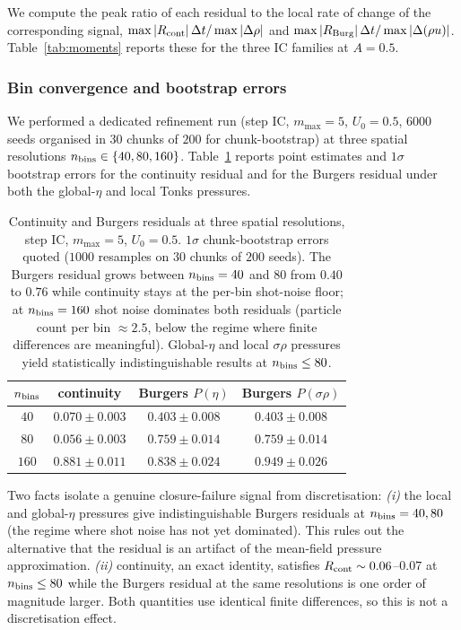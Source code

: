\documentclass[aps,pre,twocolumn,superscriptaddress,longbibliography,floatfix]{revtex4-2}
\begin{document}
We compute the peak ratio of each residual to the local rate of
change of the corresponding signal,
$\max|R_{\rm cont}|\,\Delta t / \max|\Delta\rho|$ and
$\max|R_{\rm Burg}|\,\Delta t / \max|\Delta(\rho u)|$.
Table~\ref{tab:moments} reports these for the three IC families
at $A=0.5$.

\subsubsection*{Bin convergence and bootstrap errors}

We performed a dedicated refinement run (step IC, $m_{\max}=5$,
$U_0=0.5$, $6000$ seeds organised in $30$ chunks of $200$ for
chunk-bootstrap) at three spatial resolutions
$n_{\rm bins}\in\{40,80,160\}$.
Table~\ref{tab:refine} reports point estimates and $1\sigma$
bootstrap errors for the continuity residual and for the Burgers
residual under both the global-$\eta$ and local Tonks pressures.

\begin{table}[t]
\centering
\caption{Continuity and Burgers residuals at three spatial
resolutions, step IC, $m_{\max}=5$, $U_0=0.5$.
$1\sigma$ chunk-bootstrap errors quoted ($1000$ resamples on
$30$ chunks of $200$ seeds). The Burgers residual grows
between $n_{\rm bins}=40$ and $80$ from $0.40$ to $0.76$ while
continuity stays at the per-bin shot-noise floor; at
$n_{\rm bins}=160$ shot noise dominates both residuals
(particle count per bin $\approx 2.5$, below the regime where
finite differences are meaningful). Global-$\eta$ and local
$\sigma\rho$ pressures yield statistically indistinguishable
results at $n_{\rm bins}\le 80$.}
\label{tab:refine}
\begin{tabular}{cccc}
\hline\hline
$n_{\rm bins}$ & continuity & Burgers $P(\eta)$
                                  & Burgers $P(\sigma\rho)$\\
\hline
$40$  & $0.070\pm 0.003$ & $0.403\pm 0.008$ & $0.403\pm 0.008$\\
$80$  & $0.056\pm 0.003$ & $0.759\pm 0.014$ & $0.759\pm 0.014$\\
$160$ & $0.881\pm 0.011$ & $0.838\pm 0.024$ & $0.949\pm 0.026$\\
\hline\hline
\end{tabular}
\end{table}

Two facts isolate a genuine closure-failure signal from
discretisation:
\emph{(i)} the local and global-$\eta$ pressures give
indistinguishable Burgers residuals at $n_{\rm bins}=40, 80$
(the regime where shot noise has not yet dominated). This rules
out the alternative that the residual is an artifact of the
mean-field pressure approximation.
\emph{(ii)} continuity, an exact identity, satisfies
$R_{\rm cont}\sim 0.06$--$0.07$ at $n_{\rm bins}\le 80$ while
the Burgers residual at the same resolutions is one order of
magnitude larger. Both quantities use identical finite
differences, so this is not a discretisation effect.
\end{document}
